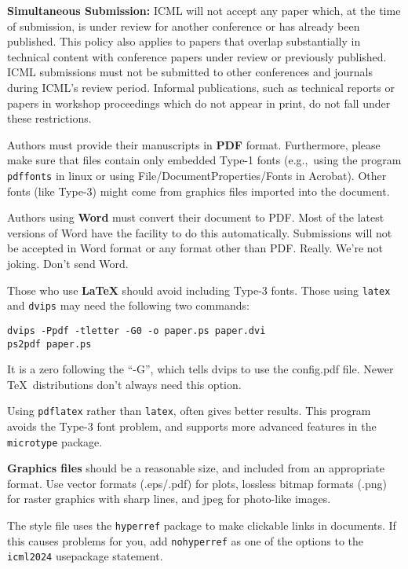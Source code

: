 \documentclass{article}
\theoremstyle{plain}
\theoremstyle{definition}
\theoremstyle{remark}
\begin{document}
\textbf{Simultaneous Submission:} ICML will not accept any paper which,
at the time of submission, is under review for another conference or
has already been published. This policy also applies to papers that
overlap substantially in technical content with conference papers
under review or previously published. ICML submissions must not be
submitted to other conferences and journals during ICML's review
period.
Informal publications, such as technical
reports or papers in workshop proceedings which do not appear in
print, do not fall under these restrictions.

\medskip

Authors must provide their manuscripts in \textbf{PDF} format.
Furthermore, please make sure that files contain only embedded Type-1 fonts
(e.g.,~using the program \texttt{pdffonts} in linux or using
File/DocumentProperties/Fonts in Acrobat). Other fonts (like Type-3)
might come from graphics files imported into the document.

Authors using \textbf{Word} must convert their document to PDF\@. Most
of the latest versions of Word have the facility to do this
automatically. Submissions will not be accepted in Word format or any
format other than PDF\@. Really. We're not joking. Don't send Word.

Those who use \textbf{\LaTeX} should avoid including Type-3 fonts.
Those using \texttt{latex} and \texttt{dvips} may need the following
two commands:

{\footnotesize
\begin{verbatim}
dvips -Ppdf -tletter -G0 -o paper.ps paper.dvi
ps2pdf paper.ps
\end{verbatim}}
It is a zero following the ``-G'', which tells dvips to use
the config.pdf file. Newer \TeX\ distributions don't always need this
option.

Using \texttt{pdflatex} rather than \texttt{latex}, often gives better
results. This program avoids the Type-3 font problem, and supports more
advanced features in the \texttt{microtype} package.

\textbf{Graphics files} should be a reasonable size, and included from
an appropriate format. Use vector formats (.eps/.pdf) for plots,
lossless bitmap formats (.png) for raster graphics with sharp lines, and
jpeg for photo-like images.

The style file uses the \texttt{hyperref} package to make clickable
links in documents. If this causes problems for you, add
\texttt{nohyperref} as one of the options to the \texttt{icml2024}
usepackage statement.
\end{document}
